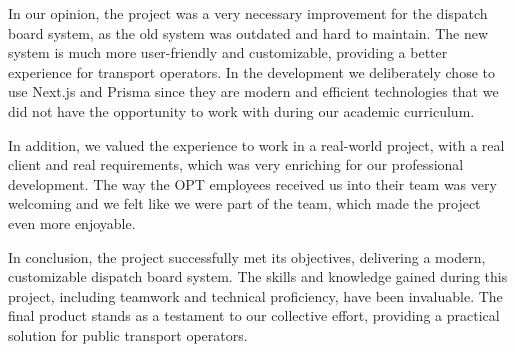 \documentclass[10pt]{article}
\begin{document}
         In our opinion, the project was a very necessary improvement for the dispatch board system, as the old system was outdated and hard to maintain. The new system is much more user-friendly and customizable, providing a better experience for transport operators. In the development we deliberately chose to use Next.js and Prisma since they are modern and efficient technologies that we did not have the opportunity to work with during our academic curriculum. 
         
         In addition, we valued the experience to work in a real-world project, with a real client and real requirements, which was very enriching for our professional development. The way the OPT employees received us into their team was very welcoming and we felt like we were part of the team, which made the project even more enjoyable.

         In conclusion, the project successfully met its objectives, delivering a modern, customizable dispatch board system. The skills and knowledge gained during this project, including teamwork and technical proficiency, have been invaluable. The final product stands as a testament to our collective effort, providing a practical solution for public transport operators.        


        
        
        \cite{nextjs}
        \cite{react}
        \cite{typescript}
        \cite{prisma}
        \cite{prisma-medium}
        
\end{document}
